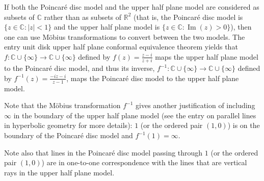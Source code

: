\documentclass[12pt]{article}
\begin{document}
If both the Poincar\'e disc model and the upper half plane model are considered as subsets of $\mathbb{C}$ rather than as subsets of $\mathbb{R}^2$ (that is, the Poincar\'e disc model is $\{ z \in \mathbb{C} : |z|<1\}$ and the upper half plane model is $\{ z \in \mathbb{C} : \operatorname{Im}(z)>0\}$), then one can use M\"obius transformations to convert between the two models.  The entry unit disk upper half plane conformal equivalence theorem yields that $f \colon \mathbb{C} \cup \{ \infty \} \to \mathbb{C} \cup \{ \infty \}$ defined by $\displaystyle f(z)=\frac{z-i}{z+i}$ maps the upper half plane model to the Poincar\'e disc model, and thus its inverse, $f^{-1} \colon \mathbb{C} \cup \{ \infty \} \to \mathbb{C} \cup \{ \infty \}$ defined by $\displaystyle f^{-1}(z)=\frac{-iz-i}{z-1}$, maps the Poincar\'e disc model to the upper half plane model.

Note that the M\"obius transformation $f^{-1}$ gives another justification of including $\infty$ in the boundary of the upper half plane model (see the entry on parallel lines in hyperbolic geometry for more details): $1$ (or the ordered pair $(1,0)$) is on the boundary of the Poincar\'e disc model and $f^{-1}(1)=\infty$.

Note also that lines in the Poincar\'e disc model passing through $1$ (or the ordered pair $(1,0)$) are in one-to-one correspondence with the lines that are vertical rays in the upper half plane model.
\end{document}
